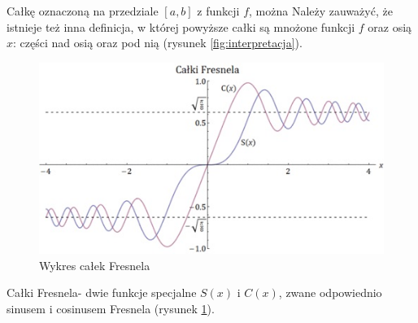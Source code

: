 \documentclass{article}
\begin{document}
Całkę oznaczoną na przedziale $[a, b]$ z funkcji $f$, można Należy zauważyć, że istnieje też inna definicja, w której powyższe całki są mnożone funkcji $f$ oraz osią $x$: części nad osią oraz pod nią (rysunek \ref{fig:interpretacja}).

\begin{figure}
\caption{Wykres całek Fresnela}
\label{fig:fresnel}
\includegraphics[scale=0.6]{calka2.png}
\centering
\end{figure}

Całki Fresnela- dwie funkcje specjalne $S(x)$ i $C(x)$, zwane odpowiednio sinusem i cosinusem Fresnela (rysunek \ref{fig:fresnel}).
\end{document}
